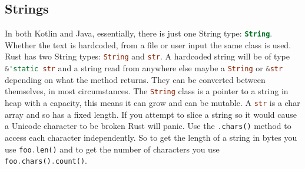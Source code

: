 \documentclass[a4paper,11pt]{article}
\begin{document}
\subsection{Strings}
In both Kotlin and Java, essentially, there is just one String type: \lstinline[language=Kotlin]{String}. Whether the text is hardcoded, from a file or user input the same class is used.
Rust has two String types: \lstinline[language=Rust]{String} and \lstinline[language=Rust]{str}. A hardcoded string will be of type \lstinline[language=Rust]{&'static str} and a string read from anywhere else maybe a \lstinline[language=Rust]{String} or \lstinline[language=Rust]{&str} depending on what the method returns. They can be converted between themselves, in most circumstances.
\newline
The \lstinline[language=Rust]{String} class is a pointer to a string in heap with a capacity, this means it can grow and can be mutable. A \lstinline[language=Rust]{str} is a char array and so has a fixed length.
\newline
\newline
If you attempt to slice a string so it would cause a Unicode character to be broken Rust will panic. Use the \lstinline[language=Rust]|.chars()| method to access each character independently. So to get the length of a string in bytes you use \lstinline[language=Rust]{foo.len()} and to get the number of characters you use \lstinline[language=Rust]{foo.chars().count()}.
\end{document}
